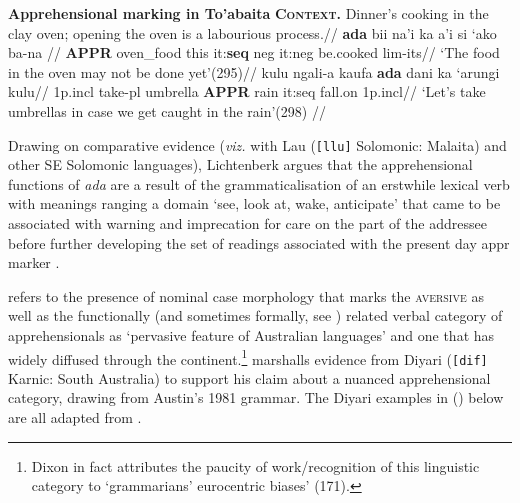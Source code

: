 \documentclass[11pt]{article}
\newcommand{\glem}[1]
{\MakeUppercase{\scriptsize{\textbf{#1}}}}
\begin{document}
	\pex \textbf{Apprehensional marking in To'abaita}
	\a\label{bare-mlu}%
	\begingl %
	\glpreamble \textbf{\textsc{Context}.} Dinner's cooking in the clay oven; opening the oven is a labourious process.//
	\gla \textbf{ada} bii na'i ka a'i si `ako ba-na // 
	\glb \glem{appr} oven\_food this it:\textbf{{\sc seq}} {\sc neg} it{\sc:neg} be.cooked {\sc lim-}its//
	\glft `The food in the oven may not be done yet'\hfill(295)//%
	\endgl %
	\a\label{link-mlu}\begingl
	\gla kulu ngali-a kaufa \textbf{ada} dani ka `arungi kulu//
	\glb 1p{\sc.incl} take{\sc-pl} umbrella \glem{appr} rain it:{\sc seq} fall.on 1p{\sc.incl}//
	\glft `Let's take umbrellas in case we get caught in the rain'\hfill(298) //\endgl
	\xe

Drawing on comparative evidence (\textit{viz.} with Lau (\texttt{[llu]} Solomonic: Malaita) and other SE Solomonic languages), Lichtenberk argues that the apprehensional functions of \textit{ada} are a result of the grammaticalisation of an erstwhile lexical verb with meanings ranging a domain `see, look at, wake, anticipate' that came to be associated with warning and imprecation for care on the part of the addressee before further developing the set of readings associated with the present day {\sc appr} marker \citeyearpar[303-4]{Lichtenberk1995}.


\citet[171]{Dixon2002a} refers to the presence of nominal case morphology that marks the \textsc{aversive} as well as the functionally (and sometimes formally, see \citealp[44]{Blake1993}) related verbal category of apprehensionals as `pervasive feature of Australian languages' and one that has widely diffused through the continent.\footnote{Dixon in fact attributes the paucity of work/recognition of this linguistic category to `grammarians' eurocentric biases' (171).} \citet[306]{Lichtenberk1995} marshalls evidence from Diyari (\texttt{[dif]} Karnic: South Australia) to support his claim about a nuanced apprehensional category, drawing from Austin's 1981 grammar. The Diyari examples in (\nextx) below are all adapted from \citet{Austin}.
\end{document}
